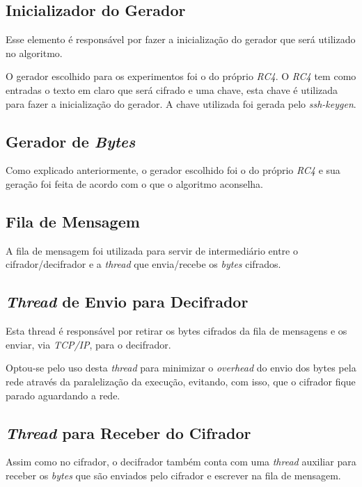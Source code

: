 \subsection{Inicializador do Gerador}

Esse elemento é responsável por fazer a inicialização do gerador que será utilizado  no algoritmo.

O gerador escolhido para os experimentos foi o do próprio \textit{RC4}. O \textit{RC4} tem como entradas o texto em claro que será cifrado e uma chave, esta chave é utilizada para fazer a inicialização do gerador. A chave utilizada foi gerada pelo \textit{ssh-keygen}.

\subsection{Gerador de \textit{Bytes}}

Como explicado anteriormente, o gerador escolhido foi o do próprio \textit{RC4} e sua geração foi feita de acordo com o que o algoritmo aconselha. 


\subsection{Fila de Mensagem}

A fila de mensagem foi utilizada para servir de intermediário entre o cifrador/decifrador e a \textit{thread} que envia/recebe os \textit{bytes} cifrados. 
  
\subsection{\textit{Thread} de Envio para Decifrador}

Esta thread é responsável por retirar os bytes cifrados da fila de mensagens e os enviar, via \textit{TCP/IP}, para o decifrador.

Optou-se pelo uso desta \textit{thread} para minimizar o \textit{overhead} do envio dos bytes pela rede através da paralelização da execução,  evitando, com isso, que o cifrador fique parado aguardando a rede.
\subsection{\textit{Thread} para Receber do Cifrador}

Assim como no cifrador, o decifrador também conta com uma \textit{thread} auxiliar para receber os \textit{bytes} que são enviados pelo cifrador e escrever na fila de mensagem.

